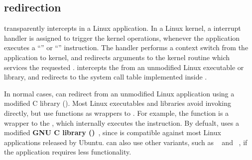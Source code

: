 \subsection{\Linuxapi{} redirection}


\thelibos{} transparently intercepts \linuxapis{} in a Linux application. In a Linux kernel, a \linuxapi{} interrupt handler is assigned
to trigger the kernel operations,
whenever the application executes
a ``'' or ``'' instruction.
The handler
performs a context switch from the application to kernel,
and redirects \linuxapi{} arguments to the kernel routine which services the requested \linuxapi{}.
\thelibos{} intercepts the \linuxapis{}
from an unmodified Linux executable or library, and redirects
to the system call table implemented inside \thelibos{}.


In normal cases,
\thelibos{} can redirect \linuxapis{} from an unmodified Linux application
using a modified C library (\libc{}).
Most Linux executables and libraries avoid invoking \linuxapis{} directly,
but use \libc{} functions as wrappers to \linuxapis{}.
For example, the \libc{} function  is a wrapper to the  \linuxapi{},
which internally executes
the  instruction.
By defualt, \thelibos{} uses a modified
{\bf GNU C library (\glibc{})}~\cite{glibc},
since \glibc{} is compatible against most Linux applications released by Ubuntu. %
\graphene{} can also use other \libc{} variants,
such as ~\cite{uclibc} and ~\cite{musl},
if the application requires less \libc{} functionality.




